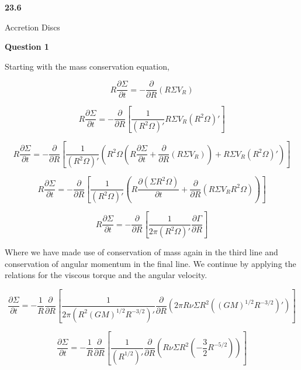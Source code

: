 \documentclass[12pt]{extarticle}
\begin{document}
\begin{flushleft}
\begin{LARGE}
\textbf{23.6}
\end{LARGE}  
\end{flushleft}

\vfill
\begin{center}
\begin{Huge}Accretion Discs\end{Huge}
\end{center}
\vfill

\pagebreak

\begin{center}
\textbf{Question 1}
\end{center}

Starting with the mass conservation equation, 

$$R\frac{\partial \Sigma}{\partial t} =-\frac{\partial}{\partial R}(R\Sigma V_R)$$

$$R\frac{\partial \Sigma}{\partial t} =-\frac{\partial}{\partial R}\left[\frac{1}{(R^2 \Omega)'} R\Sigma V_R(R^2 \Omega)'\right]$$

$$R\frac{\partial \Sigma}{\partial t}=-\frac{\partial}{\partial R}\left[\frac{1}{(R^2 \Omega)'}\left(R^2\Omega \left( R\frac{\partial \Sigma}{\partial t}+\frac{\partial}{\partial R}(R\Sigma V_R)\right)+R\Sigma V_R(R^2 \Omega)'\right)\right]$$

$$R\frac{\partial \Sigma}{\partial t}=-\frac{\partial}{\partial R}\left[\frac{1}{(R^2 \Omega)'}\left( R\frac{\partial (\Sigma R^2\Omega)}{\partial t}+\frac{\partial}{\partial R}(R\Sigma V_R R^2 \Omega)\right)\right]$$

$$R\frac{\partial \Sigma}{\partial t}=-\frac{\partial}{\partial R}\left[\frac{1}{2\pi (R^2 \Omega)'}\frac{\partial \Gamma}{\partial R} \right]$$


Where we have made use of conservation of mass again in the third line and conservation of angular momentum in the final line. We continue by applying the relations for the viscous torque and the angular velocity.

$$\frac{\partial \Sigma}{\partial t}=-\frac{1}{R}\frac{\partial}{\partial R}\left[\frac{1}{2\pi (R^2 (GM)^{1/2}R^{-3/2})'}\frac{\partial }{\partial R}(2\pi R \nu \Sigma R^2 ((GM)^{1/2}R^{-3/2})') \right]$$

$$\frac{\partial \Sigma}{\partial t}=-\frac{1}{R}\frac{\partial}{\partial R}\left[\frac{1}{(R^{1/2})'}\frac{\partial }{\partial R}\left(R \nu \Sigma R^2 \left(-\frac{3}{2}R^{-5/2}\right)\right) \right]$$
\end{document}
